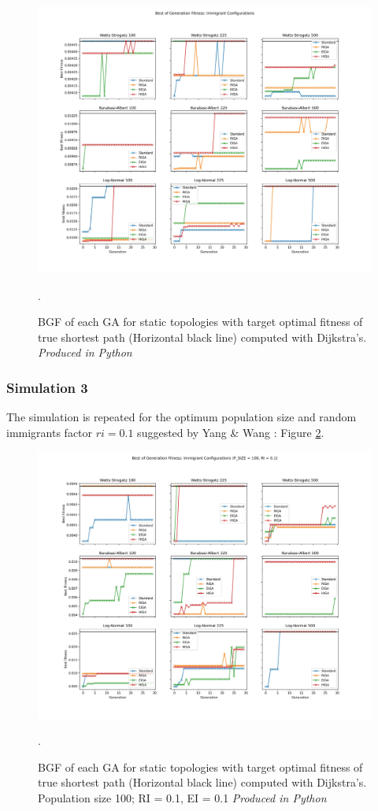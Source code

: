 \documentclass[
	a4paper, %
	10pt, %
	unnumberedsections, %
	twoside, %
]{LTJournalArticle}
\begin{document}
\begin{figure}
	\includegraphics[width=\linewidth]{Figures/sims/static/experiment_2.jpg}
	\caption{BGF of each GA for static topologies with target optimal fitness of true shortest path (Horizontal black line) computed with Dijkstra's. \emph{Produced in Python}}. 
	\label{fig:static_2}
\end{figure}

\subsubsection{Simulation 3} The simulation is repeated for the optimum population size and random immigrants factor \(ri = 0.1\) suggested by Yang \& Wang \cite{yang:10}: Figure \ref{fig:static_3}. 

\begin{figure}
	\includegraphics[width=\linewidth]{Figures/sims/static/experiment_3.jpg}
	\caption{BGF of each GA for static topologies with target optimal fitness of true shortest path (Horizontal black line) computed with Dijkstra's. Population size 100; RI = 0.1, EI = 0.1 \emph{Produced in Python}}. 
	\label{fig:static_3}
\end{figure}
\end{document}
